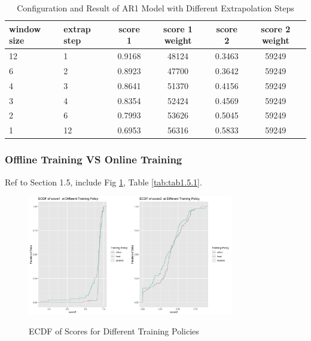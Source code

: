 \documentclass{article}
\begin{document}
\begin{table}[htbp]
  \begin{center}
    \caption{Configuration and Result of AR1 Model with Different Extrapolation Steps}
    \label{tab:tab1.4.1}
    \begin{tabular}{l|l|*{4}{c}}
      \textbf{window size} & \textbf{extrap step} & \textbf{score 1} & \textbf{score 1 weight} & \textbf{score 2} & \textbf{score 2 weight} \\
      \hline
      12 & 1 & 0.9168 & 48124 & 0.3463 & 59249\\
      6 & 2 & 0.8923 & 47700 & 0.3642 & 59249\\
      4 & 3 & 0.8641 & 51370 & 0.4156 & 59249\\
      3 & 4 & 0.8354 & 52424 & 0.4569 & 59249\\
      2 & 6 & 0.7993 & 53626 & 0.5045 & 59249\\
      1 & 12 & 0.6953 & 56316 & 0.5833 & 59249\\
    \end{tabular}
  \end{center}
\end{table}

\subsubsection{Offline Training VS Online Training}
Ref to Section 1.5, include Fig \ref{fig:fig1.5.1}, Table \ref{tab:tab1.5.1}.

\begin{figure}
    \caption{ECDF of Scores for Different Training Policies}
    \centering
    \includegraphics[width = 0.8\textwidth]{images/ECDFofscoresatDifferentTrainingPolicyOfAR1,840,1,3.png}
    \label{fig:fig1.5.1}
\end{figure}
\end{document}
